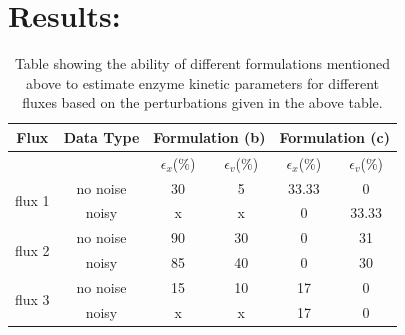 \documentclass[10pt]{article}
\begin{document}
	\section{Results:}

	\begin{table}[!tbhp]
		\caption{Table showing the ability of different formulations mentioned above to estimate enzyme kinetic parameters for different fluxes based on the perturbations given in the above table.}
		\begin{center}				
			\begin{tabular}{cccccc}
				\hline
				Flux & Data Type & \multicolumn{2}{c}{Formulation (b)} & \multicolumn{2}{c}{Formulation (c)}\\
				\hline
				&&$\epsilon_x$(\%)&$\epsilon_v$(\%)&$\epsilon_x$(\%)&$\epsilon_v$(\%)\\
				\hline
				\multirow{2}{*}{flux 1} & no noise & 30 & 5 & 33.33 & 0\\
												  &	noisy & x & x & 0 & 33.33\\
			  	\hline
				 \multirow{2}{*}{flux 2} & no noise & 90 & 30 & 0 & 31\\
				 									& noisy & 85 & 40 & 0 & 30\\
				\hline				 									
				\multirow{2}{*}{flux 3} & no noise & 15 & 10 & 17 & 0\\
													& noisy & x & x & 17 & 0\\
				\hline			
			\end{tabular}
		\end{center}	
		\label{tab:res1}
	\end{table}
\end{document}
